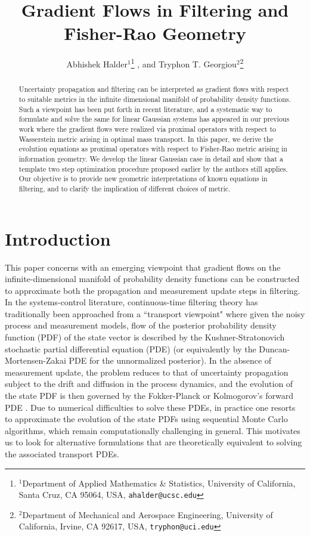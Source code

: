 \documentclass[letterpaper,10pt,twocolumn,conference]{ieeeconf}
\begin{document}
\title{Gradient Flows in Filtering and Fisher-Rao Geometry}
\author{Abhishek Halder$^{1}$\thanks{$^{1}$Department of Applied Mathematics \& Statistics, University of California, Santa Cruz,
        CA 95064, USA,
        {\tt\small{ahalder@ucsc.edu}}}%
        , and Tryphon T. Georgiou$^{2}$\thanks{$^{2}$Department of Mechanical and Aerospace Engineering, University of California, Irvine,
        CA 92617, USA,
        {\tt\small{tryphon@uci.edu}}}%
        }
\maketitle

\begin{abstract}
Uncertainty propagation and filtering can be interpreted as gradient flows with respect to suitable metrics in the infinite dimensional manifold of probability density functions. Such a viewpoint has been put forth in recent literature, and a systematic way to formulate and solve the same for linear Gaussian systems has appeared in our previous work where the gradient flows were realized via proximal operators with respect to Wasserstein metric arising in optimal mass transport. In this paper, we derive the evolution equations as proximal operators with respect to Fisher-Rao metric arising in information geometry. We develop the linear Gaussian case in detail and show that a template two step optimization procedure proposed earlier by the authors still applies. Our objective is to provide new geometric interpretations of known equations in filtering, and to clarify the implication of different choices of metric.
\end{abstract}

\section{Introduction}
This paper concerns with an emerging viewpoint that gradient flows on the infinite-dimensional manifold of probability density functions can be constructed to approximate both the propagation and measurement update steps in filtering. In the systems-control literature, continuous-time filtering theory has traditionally been approached from a ``transport viewpoint" where given the noisy process and measurement models, flow of the posterior probability density function (PDF) of the state vector is described by the Kushner-Stratonovich stochastic partial differential equation (PDE) \cite{Stratonovich1960,Kushner1964} (or equivalently by the Duncan-Mortensen-Zakai PDE \cite{duncan1970likelihood,mortensen1966stochastic,zakai1969optimal} for the unnormalized posterior). In the absence of measurement update, the problem reduces to that of uncertainty propagation subject to the drift and diffusion in the process dynamics, and the evolution of the state PDF is then governed by the Fokker-Planck or Kolmogorov's forward PDE \cite{RiskenBook1989}. Due to numerical difficulties to solve these PDEs, in practice one resorts to approximate the evolution of the state PDFs using sequential Monte Carlo algorithms, which remain computationally challenging in general. This motivates us to look for alternative formulations that are theoretically equivalent to solving the associated transport PDEs.
\end{document}

